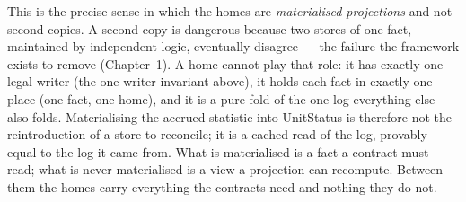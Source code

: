 This is the precise sense in which the homes are \emph{materialised projections} and not
second copies. A second copy is dangerous because two stores of one fact, maintained by
independent logic, eventually disagree --- the failure the framework exists to remove
(Chapter~1). A home cannot play that role: it has exactly one legal
writer (the one-writer invariant above), it holds each fact in exactly one place
(one fact, one home), and it is a pure fold of the one log everything else also
folds. Materialising the accrued statistic into UnitStatus is therefore not the
reintroduction of a store to reconcile; it is a cached read of the log, provably equal to
the log it came from. What is materialised is a fact a contract must read; what is never
materialised is a view a projection can recompute. Between them the homes carry everything
the contracts need and nothing they do not.
